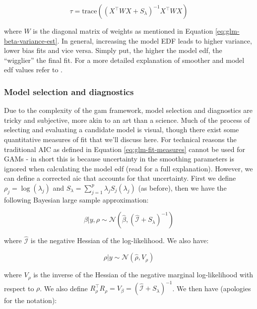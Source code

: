 \documentclass{report}
\begin{document}
\begin{equation}\label{eq:glm-gam-model-edf}
    \tau = \text{trace}\left(\left(X^\intercal W X + S_\lambda\right)^{-1} X^\intercal W X\right)
\end{equation}

where $W$ is the diagonal matrix of weights as mentioned in Equation \ref{eq:glm-beta-variance-est}. In general, increasing the model EDF leads to higher variance, lower bias fits and vice versa. Simply put, the higher the model \gls{edf}, the ``wigglier'' the final fit. For a more detailed explanation of smoother and model \gls{edf} values refer to \cite[Chapter~6.1.2]{wood_generalized_2017}. 

\subsubsection{Model selection and diagnostics}

Due to the complexity of the \gls{gam} framework, model selection and diagnostics are tricky and subjective, more akin to an art than a science. Much of the process of selecting and evaluating a candidate model is visual, though there exist some quantitative measures of fit that we'll discuss here. For technical reasons the traditional AIC as defined in Equation \ref{eq:glm-fit-measures} cannot be used for GAMs - in short this is because uncertainty in the smoothing parameters is ignored when calculating the model \gls{edf} (read \cite[Chapter~6.11]{wood_generalized_2017} for a full explanation). However, we can define a corrected \gls{aic} that accounts for that uncertainty. First we define $\rho_j = \log(\lambda_j)$ and $S_\lambda = \sum_{j=1}^p \lambda_jS_j(\lambda_j)$ (as before), then we have the following Bayesian large sample approximation:

\begin{equation}\label{eq:glm-gam-beta-asymptotics-bayesian}
    \beta | y, \rho \sim \mathcal{N}\left(\hat{\beta}, \left(\hat{\mathcal{I}} + S_\lambda\right)^{-1}\right)
\end{equation}

where $\hat{\mathcal{I}}$ is the negative Hessian of the log-likelihood. We also have:

\begin{equation}\label{eq:glm-gam-rho-asymptotics}
    \rho | y \sim \mathcal{N}\left(\hat{\rho}, V_\rho\right)
\end{equation}

where $V_\rho$ is the inverse of the Hessian of the negative marginal log-likelihood with respect to $\rho$. We also define $R_\rho^\intercal R_\rho = V_\beta = \left(\hat{\mathcal{I}} + S_\lambda\right)^{-1}$. We then have (apologies for the notation):
\end{document}
